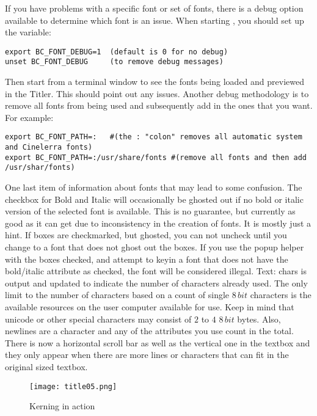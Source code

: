 If you have problems with a specific font or set of fonts, there is a debug option available to determine which font is an issue. When starting \CGG{}, you should set up the variable:

\vspace{1ex}
\begin{lstlisting}[style=sh]
export BC_FONT_DEBUG=1	(default is 0 for no debug)
unset BC_FONT_DEBUG		(to remove debug messages)
\end{lstlisting}

Then start \CGG{} from a terminal window to see the fonts being loaded and previewed in the Titler. This should point out any issues. Another debug methodology is to remove all fonts from being used and subsequently add in the ones that you want. For example:

\vspace{1ex}
\begin{lstlisting}[style=sh]
export BC_FONT_PATH=:   #(the : "colon" removes all automatic system and Cinelerra fonts)
export BC_FONT_PATH=:/usr/share/fonts #(remove all fonts and then add /usr/shar/fonts)
\end{lstlisting}

One last item of information about fonts that may lead to some confusion. The checkbox for Bold and Italic will occasionally be ghosted out if no bold or italic version of the selected font is available. This is no guarantee, but currently as good as it can get due to inconsistency in the creation of fonts. It is mostly just a hint. If boxes are checkmarked, but ghosted, you can not uncheck until you change to a font that does not ghost out the boxes. If you use the popup helper with the boxes checked, and attempt to keyin a font that does not have the bold/italic attribute as checked, the font will be considered illegal.
Text: chars is output and updated to indicate the number of characters already used. The only limit to the number of characters based on a count of single $8\, bit$ characters is the available resources on the user computer available for \CGG{} use. Keep in mind that unicode or other special characters may consist of $2$ to $4$ $8\,bit$ bytes. Also, newlines are a character and any of the attributes you use count in the total. There is now a horizontal scroll bar as well as the vertical one in the textbox and they only appear when there are more lines or characters that can fit in the original sized textbox.

\begin{figure}[hbtp]
	\centering
	\texttt{[image: title05.png]}
	\caption{Kerning in action}
	\label{fig:title05}
\end{figure}

